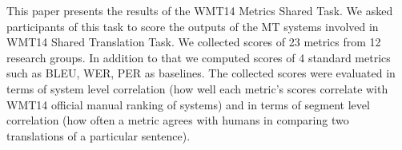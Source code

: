This paper presents the results of the WMT14 Metrics Shared Task. We asked participants of this task to score the outputs of the MT systems involved in WMT14 Shared Translation Task. We collected scores of 23 metrics from 12 research groups. In addition to that we computed scores of 4 standard metrics such as BLEU, WER, PER as baselines. The collected scores were evaluated in terms of system level correlation (how well each metric's scores correlate with WMT14 official manual ranking of systems) and in terms of segment level correlation (how often a metric agrees with humans in comparing two translations of a particular sentence).
